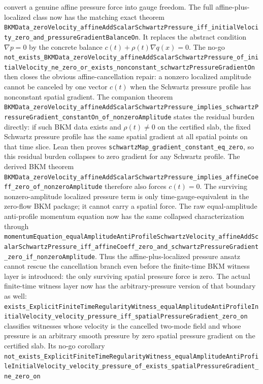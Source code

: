 \documentclass[11pt]{article}
\begin{document}
convert a genuine affine pressure force into gauge freedom.  The full
affine-plus-localized class now has the matching exact theorem
\texttt{BKMData\_zeroVelocity\_affineAddScalarSchwartzPressure\_iff\_initialVelocity\_zero\_and\_pressureGradientBalanceOn}.
It replaces the abstract condition \(\nabla p=0\) by the concrete balance
\(c(t)+\rho(t)\nabla q(x)=0\).  The no-go
\texttt{not\_exists\_BKMData\_zeroVelocity\_affineAddScalarSchwartzPressure\_of\_initialVelocity\_ne\_zero\_or\_exists\_nonconstant\_schwartzPressureGradientOn}
then closes the obvious affine-cancellation repair: a nonzero localized
amplitude cannot be canceled by one vector \(c(t)\) when the Schwartz pressure
profile has nonconstant spatial gradient.  The companion theorem
\texttt{BKMData\_zeroVelocity\_affineAddScalarSchwartzPressure\_implies\_schwartzPressureGradient\_constantOn\_of\_nonzeroAmplitude}
states the residual burden directly: if such BKM data exists and
\(\rho(t)\neq0\) on the certified slab, the fixed Schwartz pressure profile has
the same spatial gradient at all spatial points on that time slice.  Lean then
proves
\texttt{schwartzMap\_gradient\_constant\_eq\_zero}, so this residual burden
collapses to zero gradient for any Schwartz profile.  The derived BKM theorem
\texttt{BKMData\_zeroVelocity\_affineAddScalarSchwartzPressure\_implies\_affineCoeff\_zero\_of\_nonzeroAmplitude}
therefore also forces \(c(t)=0\).  The surviving nonzero-amplitude localized
pressure term is only time-gauge-equivalent in the zero-flow BKM package; it
cannot carry a spatial force.
The raw equal-amplitude anti-profile momentum equation now has the same
collapsed characterization through
\texttt{momentumEquation\_equalAmplitudeAntiProfileSchwartzVelocity\_affineAddScalarSchwartzPressure\_iff\_affineCoeff\_zero\_and\_schwartzPressureGradient\_zero\_if\_nonzeroAmplitude}.
Thus the affine-plus-localized pressure ansatz cannot rescue the cancellation
branch even before the finite-time BKM witness layer is introduced: the only
surviving spatial pressure force is zero.
The actual finite-time witness layer now has the arbitrary-pressure version of
that boundary as well:
\texttt{exists\_ExplicitFiniteTimeRegularityWitness\_equalAmplitudeAntiProfileInitialVelocity\_velocity\_pressure\_iff\_spatialPressureGradient\_zero\_on}
classifies witnesses whose velocity is the cancelled two-mode field and whose
pressure is an arbitrary smooth pressure by zero spatial pressure gradient on
the certified slab.  Its no-go corollary
\texttt{not\_exists\_ExplicitFiniteTimeRegularityWitness\_equalAmplitudeAntiProfileInitialVelocity\_velocity\_pressure\_of\_exists\_spatialPressureGradient\_ne\_zero\_on}
\end{document}
